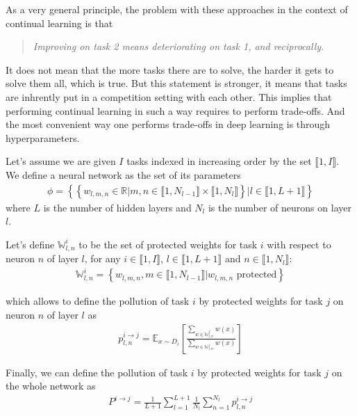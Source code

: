 \documentclass[11pt]{article}
\newcommand{\intset}[2]{\llbracket #1, #2 \rrbracket}
\begin{document}
\noindent
As a very general principle, the problem with these approaches in the context of continual learning is that
\begin{quote}
    \itshape
    \centering
    Improving on task 2 means deteriorating on task 1, and reciprocally.
\end{quote}

\noindent
It does not mean that the more tasks there are to solve, the harder it gets to solve them all, which is true. But this statement is stronger, it means that tasks are inhrently put in a competition setting with each other. This implies that performing continual learning in such a way requires to perform trade-offs. And the most convenient way one performs trade-offs in deep learning is through hyperparameters.

\vspace{1mm}
\noindent
Let's assume we are given $I$ tasks indexed in increasing order by the set $\intset{1}{I}$. We define a neural network as the set of its parameters
\begin{align}
    \phi = \left\{\left\{ w_{l,m,n} \in \mathbb{R} | m,n \in \llbracket 1, N_{l-1} \rrbracket \times \llbracket 1, N_{l} \rrbracket \right\} | l \in \llbracket 1, L+1 \rrbracket \right\}
\end{align}
where $L$ is the number of hidden layers and $N_l$ is the number of neurons on layer $l$.

\vspace{1mm}
\noindent
Let's define $\mathbb{W}_{l,n}^i$ to be the set of protected weights for task $i$ with respect to neuron $n$ of layer $l$, for any $i \in \intset{1}{I}$, $l \in \intset{1}{L+1}$ and $n \in \intset{1}{N_l}$:
\begin{align}
    \mathbb{W}_{l,n}^i = \left\{ w_{l,m,n}, m \in \intset{1}{N_{l-1}} | w_{l,m,n} \text{ protected} \right\}
\end{align}

\vspace{1mm}
\noindent
which allows to define the pollution of task $i$ by protected weights for task $j$ on neuron $n$ of layer $l$ as
\begin{align}
    p_{l,n}^{i\rightarrow j} = \mathbb{E}_{x \sim D_i}\left[\frac{\sum_{w \in \mathbb{W}_{l,n}^j}{w(x)}}{\sum_{w \in \mathbb{W}_{l,n}^i}{w(x)}}\right]
\end{align}

\vspace{1mm}
\noindent
Finally, we can define the pollution of task $i$ by protected weights for task $j$ on the whole network as
\begin{align}
    P^{i\rightarrow j} = \frac{1}{L+1}\sum_{l=1}^{L+1}{\frac{1}{N_l}\sum_{n=1}^{N_l}{p_{l,n}^{i\rightarrow j}}}
\end{align}
\end{document}
